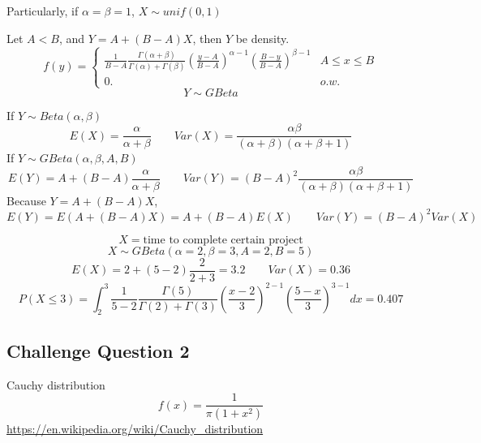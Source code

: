 \begin{prop}
Particularly, if $\alpha=\beta=1$, $X \sim unif(0,1)$
\end{prop}

\begin{prop}
Let $A < B$, and $Y=A+(B-A)X$, then $Y$ be density.
\[f(y)=\begin{cases}
\frac{1}{B-A}\frac{\Gamma(\alpha+\beta)}{\Gamma(\alpha)+\Gamma(\beta)}\left(\frac{y-A}{B-A}\right)^{\alpha-1}\left(\frac{B-y}{B-A}\right)^{\beta-1}  & A \leq x \leq B \\
0. & o.w.
\end{cases}\]
\[Y \sim GBeta\]
\end{prop}

\begin{prop}
If $Y \sim Beta(\alpha,\beta)$
\[E(X)=\frac{\alpha}{\alpha+\beta} \qquad Var(X)=\frac{\alpha\beta}{(\alpha+\beta)(\alpha+\beta+1)}\]
If $Y \sim GBeta(\alpha,\beta,A,B)$
\[E(Y)=A+(B-A)\frac{\alpha}{\alpha+\beta} \qquad Var(Y)=(B-A)^2 \frac{\alpha\beta}{(\alpha+\beta)(\alpha+\beta+1)} \]
Because $Y=A+(B-A)X$, \[E(Y)=E(A+(B-A)X)=A+(B-A)E(X) \qquad Var(Y)=(B-A)^2 Var(X)\]
\end{prop}

\begin{exmp}
\[X=\text{time to complete certain project}\]
\[X \sim GBeta(\alpha=2,\beta=3,A=2,B=5)\]
\[E(X)=2 + (5-2)\frac{2}{2+3}=3.2 \qquad Var(X)=0.36\]
\[P(X \leq 3)=\int_{2}^{3} \frac{1}{5-2}\frac{\Gamma(5)}{\Gamma(2)+\Gamma(3)}\left(\frac{x-2}{3}\right)^{2-1}\left(\frac{5-x}{3}\right)^{3-1} dx=\boxed{0.407}\]
\end{exmp}

\subsection{Challenge Question 2}
Cauchy distribution
\[f(x)=\frac{1}{\pi(1+x^2)}\]
\url{https://en.wikipedia.org/wiki/Cauchy_distribution}